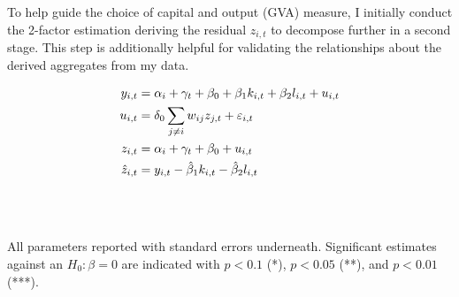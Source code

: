 To help guide the choice of capital and output (GVA) measure, I initially conduct the 2-factor estimation
deriving the residual $z_{i,t}$ to decompose further in a second stage.
This step is additionally helpful for validating the relationships about
the derived aggregates from my data.

\begin{align}
    \label{eqn:tfp2factor}
    y_{i,t} &= \alpha_i + \gamma_t + \beta_0
                + \beta_1 k_{i,t}
                + \beta_2 l_{i,t}
                + u_{i,t}
    \\ \notag
    u_{i,t} &= \delta_0 \sum_{j\neq i} w_{ij}z_{j,t} + \varepsilon_{i,t}
    \\
    z_{i,t} &= \alpha_i + \gamma_t + \beta_0 + u_{i,t}
    \\
    \hat z_{i,t} &= y_{i,t} - \hat\beta_1k_{i,t} - \hat\beta_2l_{i,t}
\end{align}

\begin{table}[hbtp]
    \centering
    \begin{threeparttable}
        \caption{Baseline 2-factor TFP estimation: varying fixed effects}%
        \label{tab:tfp_fe}
        
    \end{threeparttable}
    \\~\\
    \vspace{1em}
    \begin{threeparttable}
        \caption{... varying parameter measures}
        \label{tab:tfp_measures}
        
        \begin{tablenotes}
            All parameters reported with standard errors underneath.
            Significant estimates against an $H_0: \beta=0$ are indicated
            with $p<0.1$ (*), $p<0.05$ (**), and $p<0.01$ (***).
        \end{tablenotes}
    \end{threeparttable}
\end{table}

